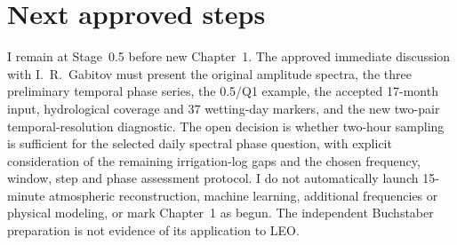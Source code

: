 \documentclass[11pt,letterpaper]{article}
\begin{document}
\section{Next approved steps}
\label{sec:next}
I remain at Stage~0.5 before new Chapter~1.
The approved immediate discussion with
I.~R.~Gabitov must present the original
amplitude spectra, the three preliminary temporal
phase series, the 0.5/Q1 example, the accepted
17-month input, hydrological coverage and 37
wetting-day markers, and the new two-pair
temporal-resolution diagnostic.
The open decision is whether two-hour sampling
is sufficient for the selected daily spectral
phase question, with explicit consideration of
the remaining irrigation-log gaps and the
chosen frequency, window, step and phase
assessment protocol. I do not automatically
launch 15-minute atmospheric reconstruction,
machine learning, additional frequencies or
physical modeling, or mark Chapter~1 as begun.
The independent Buchstaber preparation is
not evidence of its application to LEO.
\end{document}
